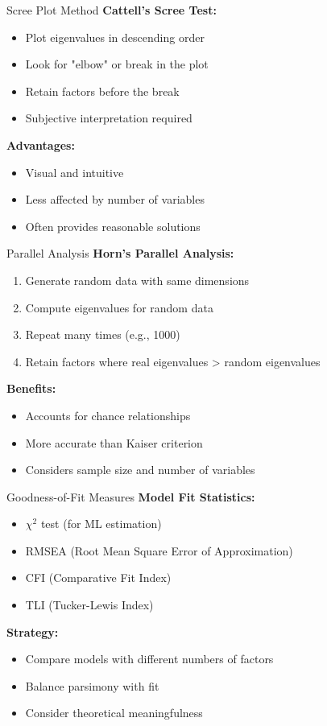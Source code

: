 \documentclass[aspectratio=169]{beamer}
\begin{document}
\begin{frame}{Scree Plot Method}
  \textbf{Cattell's Scree Test:}
  \begin{itemize}
    \item Plot eigenvalues in descending order
    \item Look for "elbow" or break in the plot
    \item Retain factors before the break
    \item Subjective interpretation required
  \end{itemize}
  
  \textbf{Advantages:}
  \begin{itemize}
    \item Visual and intuitive
    \item Less affected by number of variables
    \item Often provides reasonable solutions
  \end{itemize}
\end{frame}

\begin{frame}{Parallel Analysis}
  \textbf{Horn's Parallel Analysis:}
  \begin{enumerate}
    \item Generate random data with same dimensions
    \item Compute eigenvalues for random data
    \item Repeat many times (e.g., 1000)
    \item Retain factors where real eigenvalues > random eigenvalues
  \end{enumerate}
  
  \textbf{Benefits:}
  \begin{itemize}
    \item Accounts for chance relationships
    \item More accurate than Kaiser criterion
    \item Considers sample size and number of variables
  \end{itemize}
\end{frame}

\begin{frame}{Goodness-of-Fit Measures}
  \textbf{Model Fit Statistics:}
  \begin{itemize}
    \item $\chi^2$ test (for ML estimation)
    \item RMSEA (Root Mean Square Error of Approximation)
    \item CFI (Comparative Fit Index)
    \item TLI (Tucker-Lewis Index)
  \end{itemize}
  
  \textbf{Strategy:}
  \begin{itemize}
    \item Compare models with different numbers of factors
    \item Balance parsimony with fit
    \item Consider theoretical meaningfulness
  \end{itemize}
\end{frame}
\end{document}
